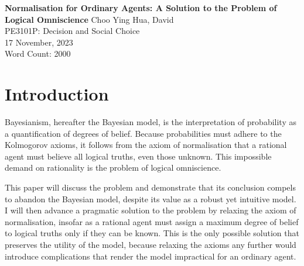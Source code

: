 \documentclass[12pt]{article}
\renewcommand{\maketitle}{%
    \begin{titlepage}
        \begin{center}
            \vfill
            \vspace*{\baselineskip}
            \vfill
            \textbf{Normalisation for Ordinary Agents: A Solution to the Problem of Logical Omniscience}
            \vfill
            Choo Ying Hua, David\\
            PE3101P: Decision and Social Choice\\
            17 November, 2023\\
            Word Count: 2000
            \vfill
        \end{center}
    \end{titlepage}
    }
\begin{document}
\maketitle
\section{Introduction}
Bayesianism, hereafter the Bayesian model, is the interpretation of probability as a quantification of degrees of belief. Because probabilities must adhere to the Kolmogorov axioms, it follows from the axiom of normalisation that a rational agent must believe all logical truths, even those unknown. This impossible demand on rationality is the problem of logical omniscience.

This paper will discuss the problem and demonstrate that its conclusion compels to abandon the Bayesian model, despite its value as a robust yet intuitive model. I will then advance a pragmatic solution to the problem by relaxing the axiom of normalisation, insofar as a rational agent must assign a maximum degree of belief to logical truths only if they can be known. This is the only possible solution that preserves the utility of the model, because relaxing the axioms any further would introduce complications that render the model impractical for an ordinary agent.
\end{document}
